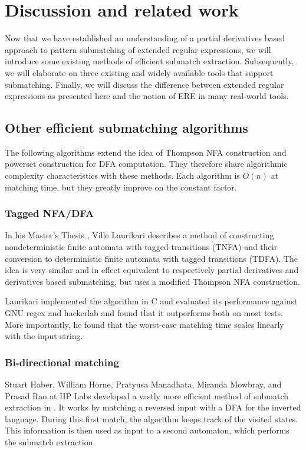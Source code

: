 \chapter{Discussion and related work}
\label{discussion}

Now that we have established an understanding of a partial derivatives based
approach to pattern submatching of extended regular expressions, we will
introduce some existing methods of efficient submatch extraction. Subsequently,
we will elaborate on three existing and widely available tools that support
submatching. Finally, we will discuss the difference between extended regular
expressions as presented here and the notion of ERE in many real-world tools.


\section{Other efficient submatching algorithms}

The following algorithms extend the idea of Thompson NFA construction and
powerset construction for DFA computation. They therefore share algorithmic
complexity characteristics with these methods. Each algorithm is $O(n)$ at
matching time, but they greatly improve on the constant factor.

\subsection{Tagged NFA/DFA}

In his Master's Thesis \cite{laurikari}, Ville Laurikari describes a method of
constructing nondeterministic finite automata with tagged transitions (TNFA) and
their conversion to deterministic finite automata with tagged transitions
(TDFA). The idea is very similar and in effect equivalent to respectively
partial derivatives and derivatives based submatching, but uses a modified
Thompson NFA construction.

Laurikari implemented the algorithm in C and evaluated its performance against
GNU regex and hackerlab and found that it outperforms both on most tests. More
importantly, he found that the worst-case matching time scales linearly with the
input string.


\subsection{Bi-directional matching}

Stuart Haber, William Horne, Pratyusa Manadhata, Miranda Mowbray, and Prasad Rao
at HP Labs developed a vastly more efficient method of submatch extraction in
\cite{bidi-re}. It works by matching a reversed input with a DFA for the
inverted language. During this first match, the algorithm keeps track of the
visited states. This information is then used as input to a second automaton,
which performs the submatch extraction.

